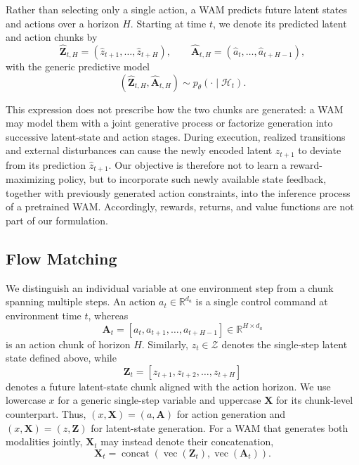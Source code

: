 Rather than selecting only a single action, a WAM predicts future latent states and
actions over a horizon $H$. Starting at time $t$, we denote its predicted latent
and action chunks by
\begin{equation}
    \hat{\mathbf{Z}}_{t,H}
    = (\hat z_{t+1},\ldots,\hat z_{t+H}),
    \qquad
    \hat{\mathbf{A}}_{t,H}
    = (\hat a_t,\ldots,\hat a_{t+H-1}),
    \label{eq:wam-prediction-chunks}
\end{equation}
with the generic predictive model
\begin{equation}
    (\hat{\mathbf{Z}}_{t,H},\hat{\mathbf{A}}_{t,H})
    \sim p_\theta(\cdot\mid\mathcal{H}_t).
    \label{eq:wam-predictive-model}
\end{equation}

This expression does not prescribe how the two chunks are generated: a WAM may
model them with a joint generative process or factorize generation into successive
latent-state and action stages. During execution, realized transitions and external
disturbances can cause the newly encoded latent $z_{t+1}$ to deviate from its
prediction $\hat z_{t+1}$. Our objective is therefore not to learn a
reward-maximizing policy, but to incorporate such newly available state feedback,
together with previously generated action constraints, into the inference process of
a pretrained WAM. Accordingly, rewards, returns, and value functions are not part of
our formulation.

\subsection{Flow Matching}
\label{sec:preliminaries:flow-matching}

We distinguish an individual variable at one environment step from a chunk spanning
multiple steps. An action
$a_t\in\mathbb{R}^{d_a}$ is a single control command at environment time $t$,
whereas
\begin{equation}
    \mathbf{A}_t
    = [a_t,a_{t+1},\ldots,a_{t+H-1}]
    \in\mathbb{R}^{H\times d_a}
    \label{eq:action-chunk}
\end{equation}
is an action chunk of horizon $H$. Similarly, $z_t\in\mathcal{Z}$ denotes the
single-step latent state defined above, while
\begin{equation}
    \mathbf{Z}_t
    = [z_{t+1},z_{t+2},\ldots,z_{t+H}]
    \label{eq:latent-chunk}
\end{equation}
denotes a future latent-state chunk aligned with the action horizon. We use
lowercase $x$ for a generic single-step variable and uppercase
$\mathbf{X}$ for its chunk-level counterpart. Thus,
$(x,\mathbf{X})=(a,\mathbf{A})$ for action generation and
$(x,\mathbf{X})=(z,\mathbf{Z})$ for latent-state generation. For a WAM that
generates both modalities jointly, $\mathbf{X}_t$ may instead denote their
concatenation,
\begin{equation}
    \mathbf{X}_t
    = \operatorname{concat}
    \!\left(\operatorname{vec}(\mathbf{Z}_t),
            \operatorname{vec}(\mathbf{A}_t)\right).
    \label{eq:joint-wam-chunk}
\end{equation}

